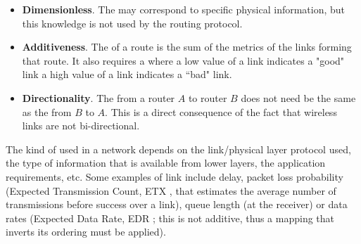 \begin{itemize}
\item {\bf Dimensionless}. The  may correspond to specific physical information, but this knowledge is not used by the routing protocol. 
\item {\bf Additiveness}. The  of a route is the sum of the metrics of the links forming that route. It also requires a  where a low value of a link  indicates a "good" link a high value of a link  indicates a ``bad" link. 
\item {\bf Directionality}. The  from a router $A$ to router $B$ does not need be the same as the  from $B$ to $A$. This is a direct consequence of the fact that wireless links are not bi-directional. 
\end{itemize}

The kind of  used in a network depends on the link/physical layer protocol used, the type of information that is available from lower layers, the application requirements, etc. Some examples of link  include delay, packet loss probability (Expected Transmission Count, ETX \cite{etx}, that estimates the average number of transmissions before success over a link), queue length (at the receiver) or data rates (Expected Data Rate, EDR \cite{edr}; this  is not additive, thus a mapping that inverts its ordering must be applied).


